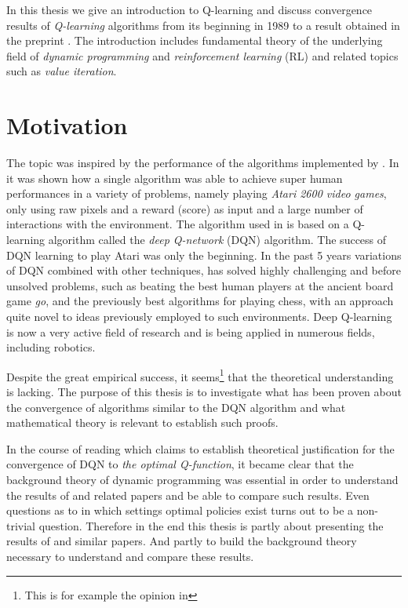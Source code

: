 In this thesis we give an introduction to Q-learning and discuss
convergence results of \emph{Q-learning} algorithms from its beginning in
1989  to a result obtained in the preprint .
The introduction includes fundamental theory of the underlying field of
\emph{dynamic programming} and \emph{reinforcement learning} (RL)
and related topics such as \emph{value iteration}.

\section{Motivation}
The topic was inspired by the performance of the algorithms
implemented by .
In  it was shown how a single algorithm was able to achieve super
human performances in a variety of problems, namely playing
\emph{Atari 2600 video games},
only using raw pixels and a reward (score) as input and a large number of
interactions with the environment.
The algorithm used in  is based on a Q-learning
algorithm called the \emph{deep Q-network} (DQN) algorithm.
The success of DQN learning to play Atari was only the beginning.
In the past 5 years variations of DQN combined with other techniques,
has solved highly challenging and before unsolved problems,
such as beating the best human players at the ancient board game \emph{go},
and the previously best algorithms for playing chess, with an approach
quite novel to ideas previously employed to such environments.
Deep Q-learning is now a very active field of research and is
being applied in numerous fields, including robotics.

Despite the great empirical success, it
seems\footnote{This is for example the opinion in }
that the theoretical understanding is lacking.
The purpose of this thesis is
to investigate what has been proven
about the convergence of algorithms similar to the DQN algorithm
and what mathematical theory is relevant to establish such proofs.

In the course of reading
 which claims to establish theoretical justification for
the convergence of DQN to \emph{the optimal Q-function},
it became clear that the background
theory of dynamic programming
was essential in order to understand the results of  and related papers
and be able to compare such results.
Even questions as to in which settings optimal policies exist turns out to be
a non-trivial question.
Therefore in the end this thesis is partly about presenting the results of
 and similar papers.
And partly to build the background theory necessary to understand and
compare these results.


